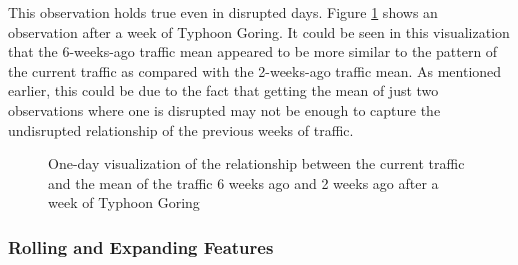 
This observation holds true even in disrupted days. Figure \ref{figure_traffic_mean_2weeks_vs_6weeks_disrupted} shows an observation after a week of Typhoon Goring. It could be seen in this visualization that the 6-weeks-ago traffic mean appeared to be more similar to the pattern of the current traffic as compared with the 2-weeks-ago traffic mean. As mentioned earlier, this could be due to the fact that getting the mean of just two observations where one is disrupted may not be enough to capture the undisrupted relationship of the previous weeks of traffic.

\begin{figure}[h] 
\centering
  \centering
  \caption{One-day visualization of the relationship between the current traffic and the mean of the traffic 6 weeks ago and 2 weeks ago after a week of Typhoon Goring}
  \label{figure_traffic_mean_2weeks_vs_6weeks_disrupted}
\end{figure}



\subsubsection{Rolling and Expanding Features}

